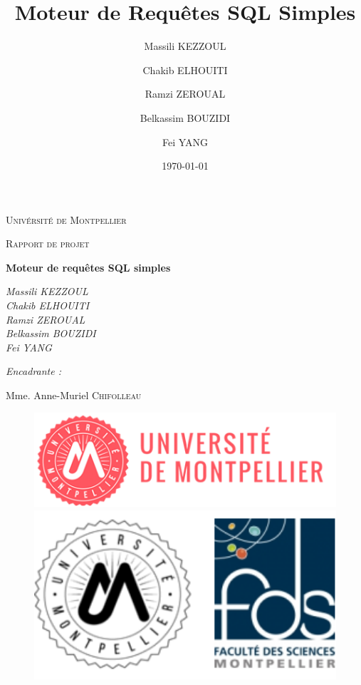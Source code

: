 \documentclass[oneside,13pt,a4paper]{report}
\title{Moteur de Requêtes SQL Simples}
\author{
    Massili KEZZOUL \and
    Chakib ELHOUITI \and
    Ramzi ZEROUAL \and
    Belkassim BOUZIDI \and
    Fei YANG
}
\date{\today}
\begin{document}
\begin{titlepage}
	\centering
	{\scshape\LARGE Univérsité de Montpellier\par}
	{\scshape\Large Rapport de projet\par}
	\vspace{1.5cm}
	{\huge\bfseries Moteur de requêtes SQL simples\par}
	\vspace{2cm}
	{\Large\itshape
		Massili KEZZOUL \\
		Chakib ELHOUITI \\
		Ramzi ZEROUAL \\
		Belkassim BOUZIDI \\
		Fei YANG \\
		\par}

	\vspace{1.5cm}

	{\Large\itshape
		Encadrante :\par
		Mme. Anne-Muriel \textsc{Chifolleau}
		\par}

	\vspace{2cm}

	\begin{figure}[h]
		\begin{minipage}[c]{.46\linewidth}
			\centering
			\includegraphics[width=1\textwidth]{img/univ-montpellier.png}
		\end{minipage}
		\hfill%
		\begin{minipage}[c]{.46\linewidth}
			\centering
			\includegraphics[width=1\textwidth]{img/fds.png}
		\end{minipage}
	\end{figure}


\end{titlepage}
\end{document}

